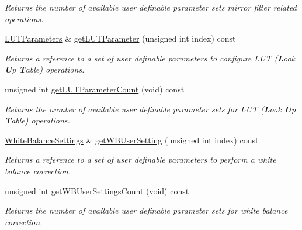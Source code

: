 \begin{DoxyCompactItemize}
\begin{DoxyCompactList}\small\item\em Returns the number of available user definable parameter sets mirror filter related operations. \end{DoxyCompactList}\item 
\hyperlink{classmv_i_m_p_a_c_t_1_1acquire_1_1_l_u_t_parameters}{L\+U\+T\+Parameters} \& \hyperlink{classmv_i_m_p_a_c_t_1_1acquire_1_1_image_processing_a07f02208dbb6e3c36409c513874212b9}{get\+L\+U\+T\+Parameter} (unsigned int index) const 
\begin{DoxyCompactList}\small\item\em Returns a reference to a set of user definable parameters to configure L\+U\+T ({\bfseries L}ook {\bfseries U}p {\bfseries T}able) operations. \end{DoxyCompactList}\item 
\hypertarget{classmv_i_m_p_a_c_t_1_1acquire_1_1_image_processing_afac0f2260a5aaa4268377fc959713699}{unsigned int \hyperlink{classmv_i_m_p_a_c_t_1_1acquire_1_1_image_processing_afac0f2260a5aaa4268377fc959713699}{get\+L\+U\+T\+Parameter\+Count} (void) const }\label{classmv_i_m_p_a_c_t_1_1acquire_1_1_image_processing_afac0f2260a5aaa4268377fc959713699}

\begin{DoxyCompactList}\small\item\em Returns the number of available user definable parameter sets for L\+U\+T ({\bfseries L}ook {\bfseries U}p {\bfseries T}able) operations. \end{DoxyCompactList}\item 
\hyperlink{classmv_i_m_p_a_c_t_1_1acquire_1_1_white_balance_settings}{White\+Balance\+Settings} \& \hyperlink{classmv_i_m_p_a_c_t_1_1acquire_1_1_image_processing_a1ebc9e7e21a15bee6d2fa867bb453d75}{get\+W\+B\+User\+Setting} (unsigned int index) const 
\begin{DoxyCompactList}\small\item\em Returns a reference to a set of user definable parameters to perform a white balance correction. \end{DoxyCompactList}\item 
\hypertarget{classmv_i_m_p_a_c_t_1_1acquire_1_1_image_processing_aac11633f1c2cba7a8f8bf7bc58978e6e}{unsigned int \hyperlink{classmv_i_m_p_a_c_t_1_1acquire_1_1_image_processing_aac11633f1c2cba7a8f8bf7bc58978e6e}{get\+W\+B\+User\+Settings\+Count} (void) const }\label{classmv_i_m_p_a_c_t_1_1acquire_1_1_image_processing_aac11633f1c2cba7a8f8bf7bc58978e6e}

\begin{DoxyCompactList}\small\item\em Returns the number of available user definable parameter sets for white balance correction. \end{DoxyCompactList}\end{DoxyCompactItemize}
